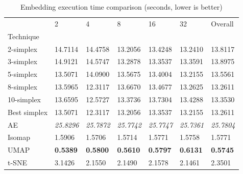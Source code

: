 \begin{table}
\caption{Embedding execution time comparison (seconds, lower is better)}
\label{tab:results_embed_time}
\begin{center}
\begin{tabular}{lllllll}
\toprule
 & 2 & 4 & 8 & 16 & 32 & Overall \\
Technique &  &  &  &  &  &  \\
\midrule
2-simplex & 14.7114 & 14.4758 & 13.2056 & 13.4248 & 13.2410 & 13.8117 \\
3-simplex & 14.9121 & 14.5747 & 13.2878 & 13.3537 & 13.3591 & 13.8975 \\
5-simplex & 13.5071 & 14.0900 & 13.5675 & 13.4004 & 13.2155 & 13.5561 \\
8-simplex & 13.5965 & 12.3117 & 13.6670 & 13.4677 & 13.2625 & 13.2611 \\
10-simplex & 13.6595 & 12.5727 & 13.3736 & 13.7304 & 13.4288 & 13.3530 \\
Best simplex & 13.5071 & 12.3117 & 13.2056 & 13.3537 & 13.2155 & 13.2611 \\
AE & \textit{25.8296} & \textit{25.7872} & \textit{25.7742} & \textit{25.7747} & \textit{25.7361} & \textit{25.7804} \\
Isomap & 1.5906 & 1.5706 & 1.5714 & 1.5771 & 1.5758 & 1.5771 \\
UMAP & \textbf{0.5389} & \textbf{0.5800} & \textbf{0.5610} & \textbf{0.5797} & \textbf{0.6131} & \textbf{0.5745} \\
t-SNE & 3.1426 & 2.1550 & 2.1490 & 2.1578 & 2.1461 & 2.3501 \\
\bottomrule
\end{tabular}
\end{center}
\end{table}
